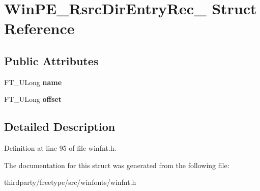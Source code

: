 \hypertarget{struct_win_p_e___rsrc_dir_entry_rec__}{}\section{Win\+P\+E\+\_\+\+Rsrc\+Dir\+Entry\+Rec\+\_\+ Struct Reference}
\label{struct_win_p_e___rsrc_dir_entry_rec__}
\subsection*{Public Attributes}
\begin{DoxyCompactItemize}
\item 
\mbox{\label{struct_win_p_e___rsrc_dir_entry_rec___a03d6c75df6b30b5f3d926687c711bc31}} 
F\+T\+\_\+\+U\+Long {\bfseries name}
\item 
\mbox{\label{struct_win_p_e___rsrc_dir_entry_rec___a788c2db384443d5eae531f59eba169e8}} 
F\+T\+\_\+\+U\+Long {\bfseries offset}
\end{DoxyCompactItemize}


\subsection{Detailed Description}


Definition at line 95 of file winfnt.\+h.



The documentation for this struct was generated from the following file\+:\begin{DoxyCompactItemize}
\item 
thirdparty/freetype/src/winfonts/winfnt.\+h\end{DoxyCompactItemize}
